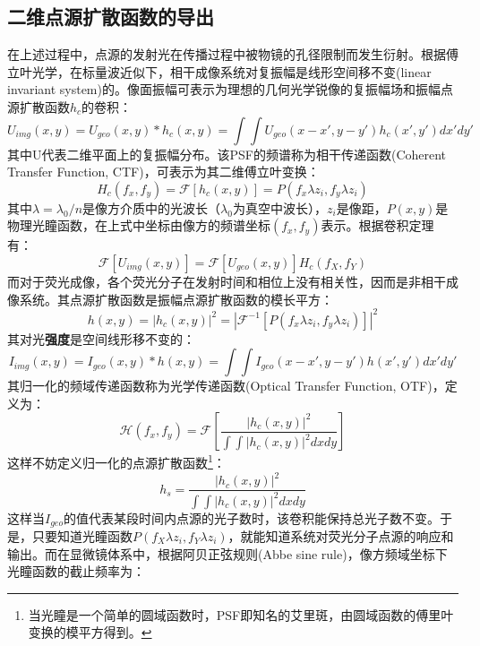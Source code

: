 \documentclass[draft=false,oneside]{fduthesis}
\begin{document}
    \subsection{二维点源扩散函数的导出}
    在上述过程中，点源的发射光在传播过程中被物镜的孔径限制而发生衍射。根据傅立叶光学，在标量波近似下，相干成像系统对复振幅是线形空间移不变(linear invariant system)的。像面振幅可表示为理想的几何光学锐像的复振幅场和振幅点源扩散函数$h_c$的卷积：
    \begin{equation}
        U_{img}(x,y)=U_{geo}(x,y)*h_c(x,y)=\int\int U_{geo}(x-x',y-y')h_c(x',y')dx'dy'
    \end{equation}
    其中U代表二维平面上的复振幅分布。该PSF的频谱称为相干传递函数(Coherent Transfer Function, CTF)，可表示为其二维傅立叶变换：
    \begin{equation}
        H_c(f_x,f_y)=\mathscr{F}[h_c(x,y)]=P(f_x\lambda z_i,f_y\lambda z_i)
    \end{equation}
    其中$\lambda=\lambda_0/n$是像方介质中的光波长（$\lambda_0$为真空中波长），$z_i$是像距，$P(x,y)$是物理光瞳函数，在上式中坐标由像方的频谱坐标$(f_x,f_y)$表示。根据卷积定理有：
    \begin{equation}
        \mathscr{F}[U_{img}(x,y)]=\mathscr{F}[U_{geo}(x,y)]H_c(f_X,f_Y)
    \end{equation}
    而对于荧光成像，各个荧光分子在发射时间和相位上没有相关性，因而是非相干成像系统。其点源扩散函数是振幅点源扩散函数的模长平方：
    \begin{equation}
        h(x,y)=|h_c(x,y)|^2=|\mathscr{F}^{-1}[P(f_x\lambda z_i,f_y\lambda z_i)]|^2
    \end{equation}
    其对光\textbf{强度}是空间线形移不变的：
    \begin{equation}
        I_{img}(x,y)=I_{geo}(x,y)*h(x,y)=\int\int I_{geo}(x-x',y-y')h(x',y')dx'dy'
    \end{equation}
    其归一化的频域传递函数称为光学传递函数(Optical Transfer Function, OTF)，定义为：
    \begin{equation}
        \mathscr{H}(f_x,f_y)=\mathscr{F}[\frac{|h_c(x,y)|^2}{\int\int |h_c(x,y)|^2dxdy}]
    \end{equation}
    这样不妨定义归一化的点源扩散函数\footnote{当光瞳是一个简单的圆域函数时，PSF即知名的艾里斑，由圆域函数的傅里叶变换的模平方得到。}：
    \begin{equation}
        h_s=\frac{|h_c(x,y)|^2}{\int\int |h_c(x,y)|^2dxdy}
    \end{equation}
    这样当$I_{geo}$的值代表某段时间内点源的光子数时，该卷积能保持总光子数不变。于是，只要知道光瞳函数$P(f_X\lambda z_i,f_Y\lambda z_i)$，就能知道系统对荧光分子点源的响应和输出。而在显微镜体系中，根据阿贝正弦规则(Abbe sine rule)，像方频域坐标下光瞳函数的截止频率为：
\end{document}
